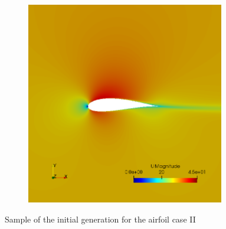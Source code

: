 \begin{figure}[h!]
\begin{subfigure}[t]{0.31\textwidth}
    \end{subfigure}
    \begin{subfigure}[t]{0.31\textwidth}
        \includegraphics[width=0.95\textwidth, height=0.17\textheight]{Figures/4/LDAg0i107.png}
    \end{subfigure}
    \caption{Sample of the initial generation for the airfoil case II}
    \label{fig:initialLD}
\end{figure}


